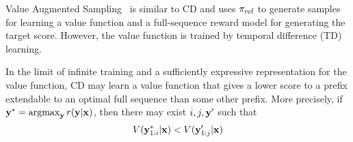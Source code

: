 Value Augmented Sampling~\citep[VAS][]{han2024value} is similar to CD and uses $\pi_\text{ref}$ to generate samples for learning a value function and a full-sequence reward model for generating the target score. However, the value function is trained by temporal difference (TD) learning.


\begin{theorem}
\label{thm:full_for_partial}
In the limit of infinite training and a sufficiently expressive representation for the value function, CD may learn a value function that gives a lower score to a prefix extendable to an optimal full sequence than some other prefix.  More precisely, if ${\mathbf{y}}^* = \operatorname*{argmax}_{{\mathbf{y}}} r({\mathbf{y}}|{\mathbf{x}})$, then there may exist $i,j,{\mathbf{y}}'$ such that
\begin{equation}
V({\mathbf{y}}^*_{1:i}|{\mathbf{x}}) < V({\mathbf{y}}'_{1:j}|{\mathbf{x}})
\end{equation}


\end{theorem}

